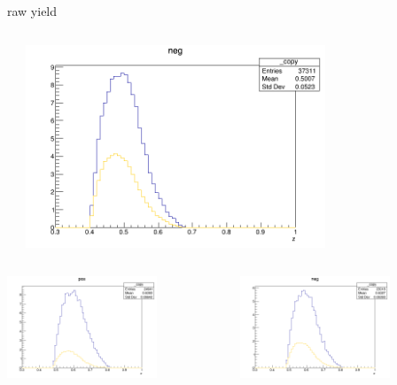 \begin{frame}{raw yield}
\begin{columns}
\begin{column}[T]{0.25\textwidth}
\end{column}
\begin{column}[T]{0.25\textwidth}
\includegraphics[width = 0.7\textwidth]{results/yield/statistics/yield_x_Q2_z_0.60_4.775_0.50_neg.png}
\end{column}
\end{columns}
\begin{columns}
\begin{column}[T]{0.25\textwidth}
\includegraphics[width = 0.7\textwidth]{results/yield/statistics/yield_x_Q2_z_0.60_4.775_0.60_pos.png}
\end{column}
\begin{column}[T]{0.25\textwidth}
\includegraphics[width = 0.7\textwidth]{results/yield/statistics/yield_x_Q2_z_0.60_4.775_0.60_neg.png}

\end{column}
\end{columns}
\end{frame}
